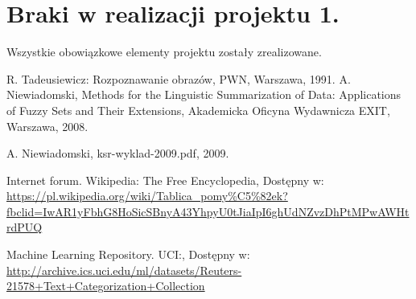 \documentclass{classrep}
\begin{document}
\section{Braki w realizacji projektu 1.}
Wszystkie obowiązkowe elementy projektu zostały zrealizowane.

\begin{thebibliography}{0}
 R. Tadeusiewicz: Rozpoznawanie obrazów, PWN, Warszawa, 1991.  
 A. Niewiadomski, Methods for the Linguistic Summarization of Data: Applications of Fuzzy Sets and Their Extensions, Akademicka Oficyna Wydawnicza EXIT, Warszawa, 2008.

 A. Niewiadomski, ksr-wyklad-2009.pdf, 2009.

 Internet forum. Wikipedia: The Free Encyclopedia, Dostępny w: \url{https://pl.wikipedia.org/wiki/Tablica_pomy%C5%82ek?fbclid=IwAR1yFbhG8HoSicSBnyA43YhpyU0tJiaIpI6ghUdNZvzDhPtMPwAWHtrdPUQ}

 Machine Learning Repository. UCI:, Dostępny w: \url{http://archive.ics.uci.edu/ml/datasets/Reuters-21578+Text+Categorization+Collection}

\end{thebibliography}
\end{document}
